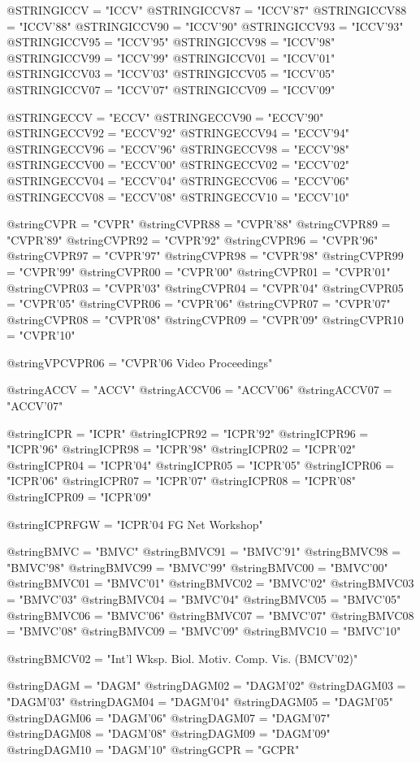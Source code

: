@STRING{ICCV   = "ICCV"}
@STRING{ICCV87 = "ICCV'87"}
@STRING{ICCV88 = "ICCV'88"}
@STRING{ICCV90 = "ICCV'90"}
@STRING{ICCV93 = "ICCV'93"}
@STRING{ICCV95 = "ICCV'95"}
@STRING{ICCV98 = "ICCV'98"}
@STRING{ICCV99 = "ICCV'99"}
@STRING{ICCV01 = "ICCV'01"}
@STRING{ICCV03 = "ICCV'03"}
@STRING{ICCV05 = "ICCV'05"}
@STRING{ICCV07 = "ICCV'07"}
@STRING{ICCV09 = "ICCV'09"}

@STRING{ECCV   = "ECCV"}
@STRING{ECCV90 = "ECCV'90"}
@STRING{ECCV92 = "ECCV'92"}
@STRING{ECCV94 = "ECCV'94"}
@STRING{ECCV96 = "ECCV'96"}
@STRING{ECCV98 = "ECCV'98"}
@STRING{ECCV00 = "ECCV'00"}
@STRING{ECCV02 = "ECCV'02"}
@STRING{ECCV04 = "ECCV'04"}
@STRING{ECCV06 = "ECCV'06"}
@STRING{ECCV08 = "ECCV'08"}
@STRING{ECCV10 = "ECCV'10"}

@string{CVPR   = "CVPR"}
@string{CVPR88 = "CVPR'88"}
@string{CVPR89 = "CVPR'89"}
@string{CVPR92 = "CVPR'92"}
@string{CVPR96 = "CVPR'96"}
@string{CVPR97 = "CVPR'97"}
@string{CVPR98 = "CVPR'98"}
@string{CVPR99 = "CVPR'99"}
@string{CVPR00 = "CVPR'00"}
@string{CVPR01 = "CVPR'01"}
@string{CVPR03 = "CVPR'03"}
@string{CVPR04 = "CVPR'04"}
@string{CVPR05 = "CVPR'05"}
@string{CVPR06 = "CVPR'06"}
@string{CVPR07 = "CVPR'07"}
@string{CVPR08 = "CVPR'08"}
@string{CVPR09 = "CVPR'09"}
@string{CVPR10 = "CVPR'10"}

@string{VPCVPR06 = "CVPR'06 Video Proceedings"}

@string{ACCV   = "ACCV"}
@string{ACCV06 = "ACCV'06"}
@string{ACCV07 = "ACCV'07"}

@string{ICPR   = "ICPR"}
@string{ICPR92 = "ICPR'92"}
@string{ICPR96 = "ICPR'96"}
@string{ICPR98 = "ICPR'98"}
@string{ICPR02 = "ICPR'02"}
@string{ICPR04 = "ICPR'04"}
@string{ICPR05 = "ICPR'05"}
@string{ICPR06 = "ICPR'06"}
@string{ICPR07 = "ICPR'07"}
@string{ICPR08 = "ICPR'08"}
@string{ICPR09 = "ICPR'09"}

@string{ICPRFGW = "ICPR'04 FG Net Workshop"}

@string{BMVC   = "BMVC"}
@string{BMVC91 = "BMVC'91"}
@string{BMVC98 = "BMVC'98"}
@string{BMVC99 = "BMVC'99"}
@string{BMVC00 = "BMVC'00"}
@string{BMVC01 = "BMVC'01"}
@string{BMVC02 = "BMVC'02"}
@string{BMVC03 = "BMVC'03"}
@string{BMVC04 = "BMVC'04"}
@string{BMVC05 = "BMVC'05"}
@string{BMVC06 = "BMVC'06"}
@string{BMVC07 = "BMVC'07"}
@string{BMVC08 = "BMVC'08"}
@string{BMVC09 = "BMVC'09"}
@string{BMVC10 = "BMVC'10"}

@string{BMCV02 = "Int'l Wksp. Biol. Motiv. Comp. Vis. (BMCV'02)"}

@string{DAGM   = "DAGM"}
@string{DAGM02 = "DAGM'02"}
@string{DAGM03 = "DAGM'03"}
@string{DAGM04 = "DAGM'04"}
@string{DAGM05 = "DAGM'05"}
@string{DAGM06 = "DAGM'06"}
@string{DAGM07 = "DAGM'07"}
@string{DAGM08 = "DAGM'08"}
@string{DAGM09 = "DAGM'09"}
@string{DAGM10 = "DAGM'10"}
@string{GCPR = "GCPR"}


